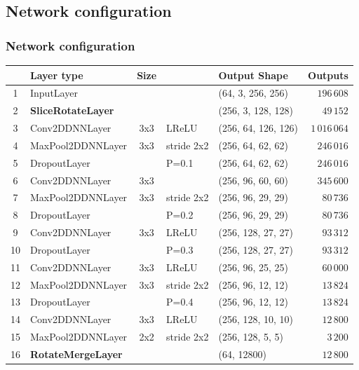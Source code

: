 \subsection{Network configuration}

\begin{frame}\frametitle{Network configuration}
\centering
\begin{table}[]
\tiny
\centering
\begin{tabular}{@{}clcllr@{}}
\toprule
   & Layer type                & Size &             & Output Shape        & Outputs \\ \midrule
1  & InputLayer                &      &             & (64, 3, 256, 256)   & $196\,608$  \\
2  & \textbf{SliceRotateLayer} &      &             & (256, 3, 128, 128)  & $49\,152$   \\
3  & Conv2DDNNLayer            & 3x3  & LReLU       & (256, 64, 126, 126) & $1\,016\,064$ \\
4  & MaxPool2DDNNLayer         & 3x3  & stride 2x2  & (256, 64, 62, 62)   & $246\,016$  \\
5  & DropoutLayer              &      & P=0.1       & (256, 64, 62, 62)   & $246\,016$  \\
6  & Conv2DDNNLayer            & 3x3  &             & (256, 96, 60, 60)   & $345\,600$  \\
7  & MaxPool2DDNNLayer         & 3x3  & stride 2x2  & (256, 96, 29, 29)   & $80\,736$   \\
8  & DropoutLayer              &      & P=0.2       & (256, 96, 29, 29)   & $80\,736$   \\
9  & Conv2DDNNLayer            & 3x3  & LReLU       & (256, 128, 27, 27)  & $93\,312$   \\
10 & DropoutLayer              &      & P=0.3       & (256, 128, 27, 27)  & $93\,312$   \\
11 & Conv2DDNNLayer            & 3x3  & LReLU       & (256, 96, 25, 25)   & $60\,000$   \\
12 & MaxPool2DDNNLayer         & 3x3  & stride 2x2  & (256, 96, 12, 12)   & $13\,824$   \\
13 & DropoutLayer              &      & P=0.4       & (256, 96, 12, 12)   & $13\,824$   \\
14 & Conv2DDNNLayer            & 3x3  & LReLU       & (256, 128, 10, 10)  & $12\,800$   \\
15 & MaxPool2DDNNLayer         & 2x2  & stride 2x2  & (256, 128, 5, 5)    & $3\,200$    \\
16 & \textbf{RotateMergeLayer} &      &             & (64, 12800)         & $12\,800$   \\

\end{tabular}
\end{table}
\end{frame}
